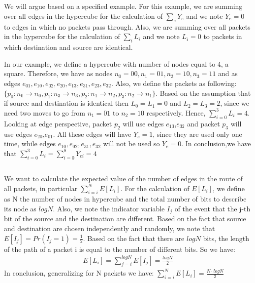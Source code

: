 \documentclass[11pt]{537homework}
\begin{document}
\subsection{}
We will argue based on a specified example. For this example, we are summing over all edges in the hypercube for the calculation of $\sum_{e}^{} Y_e$ and we note $Y_e = 0$ to edges in which no packets pass through. Also, we are summing over all packets in the hypercube for the calculation of  $\sum_{i}^{} L_i$ and we note $L_i = 0$ to packets in which destination and source are identical. 
\par In our example, we define a hypercube with number of nodes equal to 4, a square. Therefore, we have as nodes $n_0 = 00, n_1 = 01, n_2 = 10, n_3 =11$ and as edges $e_{01},e_{10},e_{02},e_{20},e_{13},e_{31},e_{23},e_{32}$. Also, we define the packets as following: $\{p_0:n_0 \rightarrow n_0,p_1:n_3 \rightarrow n_3,p_2:n_1 \rightarrow n_2,p_3:n_2 \rightarrow n_1\}$. Based on the assumption that if source and destination is identical then $L_0 = L_1 = 0 $ and $L_2 = L_3 = 2$, since we need two moves to go from $n_1 = 01$ to $n_2 = 10$ respectively. Hence,  $\sum_{i= 0}^{3} L_i = 4$. Looking at edge perspective, packet $p_2$ will use edges $e_{13}$,$e_{32}$ and packet $p_3$ will use edges $e_{20}$,$e_{01}$. All these edges will have $Y_e = 1$, since they are used only one time, while edges $e_{10}, e_{02}, e_{31}, e_{32}$ will not be used so $Y_e = 0$. In conclusion,we have that $\sum_{i= 0}^{3} L_i = \sum_{i= 0}^{8} Y_{ei} = 4$
\subsection{}
We want to calculate the expected value of the number of edges in the route of all packets, in particular $\sum_{i= i}^{N} E[L_i]$.
For the calculation of $E[L_i]$, we define as N the number of nodes in hypercube and the total number of bits to describe its node as $logN$. Also, we note the indicator variable $I_j$ of the event that the j-th bit of the source and the destination are different. Based on the fact that source and destination are chosen independently and randomly, we note that $E[I_j] = Pr(I_j = 1) = \frac{1}{2}$. Based on the fact that there are $logN$ bits, the length of the path of a packet i is equal to the number of different bits. So we have:
\begin{align*}
E[L_i] = \sum_{j= i}^{logN} E[I_j] = \frac{logN}{2}
\end{align*}
In conclusion, generalizing for N packets we have: $\sum_{i= i}^{N} E[L_i] = \frac{N \cdot logN}{2}$
\end{document}
